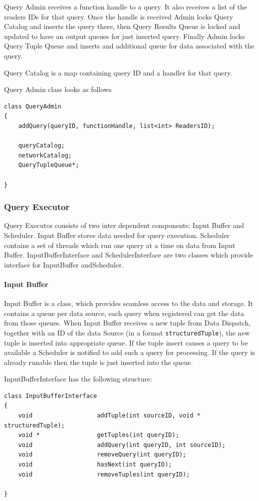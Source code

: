 \documentclass[11pt]{article}
\begin{document}
Query Admin receives a function handle to a query. It also receives a list of the readers IDs for that query. Once the handle is received Admin locks Query Catalog and inserts the query there, then Query Results Queue is locked and updated to have an output queues for just inserted query. Finally Admin locks Query Tuple Queue and inserts and additional queue for data associated with the query. 

Query Catalog is a map containing query ID and a handler for that query. 

Query Admin class looks as follows
\begin{verbatim}
class QueryAdmin
{
    addQuery(queryID, functionHandle, list<int> ReadersID);

	queryCatalog;
	networkCatalog;
	QueryTupleQueue*;
	
}
\end{verbatim}

\subsubsection{Query Executor}

Query Executor consists of two inter dependent components: Input Buffer and Scheduler. Input Buffer stores data needed for query execution. Scheduler contains a set of threads which run one query at a time on data from Input Buffer. InputBufferInterface and SchedulerInterface are two classes which provide interface for InputBuffer andScheduler. 

\paragraph{Input Buffer}

Input Buffer is a class, which provides seamless access to the data and storage. It contains a queue per data source, each query when registered can get the data from those queues. When Input Buffer receives a new tuple from Data Dispatch, together with an ID of the data Source (in a format {\tt structuredTuple}), the new tuple is inserted into appropriate queue. If the tuple insert causes a query to be available a Scheduler is notified to add such a query for processing. If the query is already runable then the tuple is just inserted into the queue.

\noindent InputBufferInterface has the following structure:

\begin{verbatim}
class InputBufferInterface
{
    void                  addTuple(int sourceID, void * structuredTuple);
    void *                getTuples(int queryID);
    void                  addQuery(int queryID, int sourceID);
    void                  removeQuery(int queryID);
    void                  hasNext(int queryID);
    void                  removeTuples(int queryID);
	
}
\end{verbatim}
\end{document}
